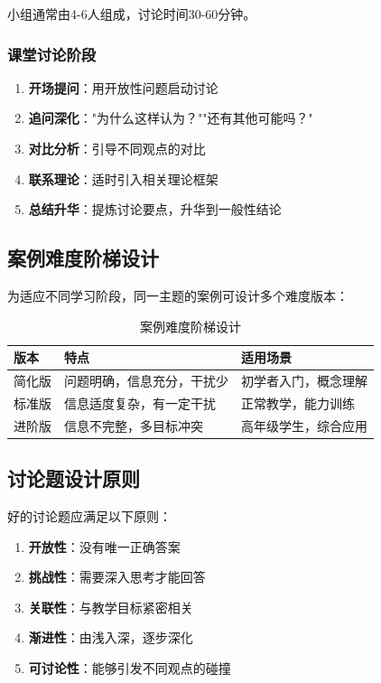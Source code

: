 \documentclass[12pt,a4paper]{ctexart}
\begin{document}
小组通常由4-6人组成，讨论时间30-60分钟。

\subsubsection{课堂讨论阶段}

\begin{methodbox}[课堂讨论教师引导技巧]
\begin{enumerate}[leftmargin=2em]
    \item \textbf{开场提问}：用开放性问题启动讨论
    \item \textbf{追问深化}："为什么这样认为？""还有其他可能吗？"
    \item \textbf{对比分析}：引导不同观点的对比
    \item \textbf{联系理论}：适时引入相关理论框架
    \item \textbf{总结升华}：提炼讨论要点，升华到一般性结论
\end{enumerate}
\end{methodbox}

\subsection{案例难度阶梯设计}

为适应不同学习阶段，同一主题的案例可设计多个难度版本：

\begin{table}[htbp]
\centering
\caption{案例难度阶梯设计}
\begin{tabular}{p{2cm}p{4cm}p{6cm}}
\toprule
\textbf{版本} & \textbf{特点} & \textbf{适用场景} \\
\midrule
简化版 & 问题明确，信息充分，干扰少 & 初学者入门，概念理解 \\
标准版 & 信息适度复杂，有一定干扰 & 正常教学，能力训练 \\
进阶版 & 信息不完整，多目标冲突 & 高年级学生，综合应用 \\
\bottomrule
\end{tabular}
\end{table}

\subsection{讨论题设计原则}

好的讨论题应满足以下原则：

\begin{enumerate}[leftmargin=2em]
    \item \textbf{开放性}：没有唯一正确答案
    \item \textbf{挑战性}：需要深入思考才能回答
    \item \textbf{关联性}：与教学目标紧密相关
    \item \textbf{渐进性}：由浅入深，逐步深化
    \item \textbf{可讨论性}：能够引发不同观点的碰撞
\end{enumerate}
\end{document}
